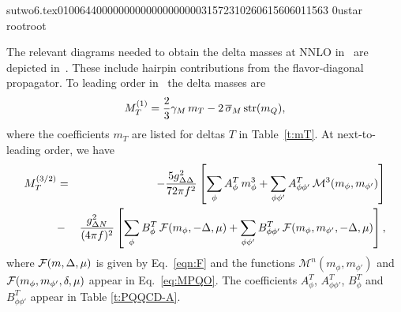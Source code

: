                                                                                                                                                                                                                                                                                       sutwo6.tex                                                                                          0100644 0000000 0000000 00000315723 10260615606 011563  0                                                                                                    ustar   root                            root                                                                                                                                                                                                                   \documentclass[prd,amssymb,amsmath,showpacs,nofootinbib,superscriptaddress]{revtex4}
\begin{document}
The relevant diagrams needed to obtain the delta masses at NNLO in \PQCPT\
are depicted in~\cite{Tiburzi:2004rh}. These include hairpin contributions
from the flavor-diagonal propagator. 
To leading order in \PQCPT\ the delta masses are
\begin{equation}
M^{(1)}_T = \frac{2}{3} \gamma_M \, m_T  - 2 \, {\overline{\sigma}}_M \, \text{str} (m_Q),
\label{eq:MPQLO}
\end{equation}
where the coefficients  $m_T$ are listed for deltas $T$ in Table~\ref{t:mT}. 
At next-to-leading order, we have
\begin{eqnarray}
M^{(3/2)}_T &=& -\frac{5 g_{{\Delta} {\Delta}}^2}{72 \pi f^2} 
\left[ 
\sum_\phi A_\phi^T \, m_\phi^3 
+ 
\sum_{\phi\phi'} A_{\phi\phi'}^T \, \mathcal{M}^3 (m_\phi, m_{\phi'}) 
\right]
\notag \\ 
&-& \frac{g_{{\Delta} N}^2}{(4 \pi f)^2} 
\left[ \sum_\phi  B_\phi^T  \, {\mathcal F} (m_\phi,-{\Delta},\mu)
+
\sum_{\phi\phi'} B^T_{\phi\phi'} \, {\mathcal F} (m_\phi, m_{\phi'}, -{\Delta}, \mu) \right]
,\end{eqnarray}
where $\mathcal{F}(m,{\Delta},\mu)$ is given by Eq.~\eqref{eqn:F}
and the functions $\mathcal{M}^n (m_\phi, m_{\phi'})$
and ${\mathcal F} (m_\phi, m_{\phi'}, {\delta}, \mu)$ appear in 
Eq.~\eqref{eq:MPQO}.
The coefficients $A^T_\phi$, $A^T_{\phi\phi'}$, $B^T_\phi$ and
$B_{\phi\phi'}^T$ appear in Table \ref{t:PQQCD-A}. 
\end{document}
